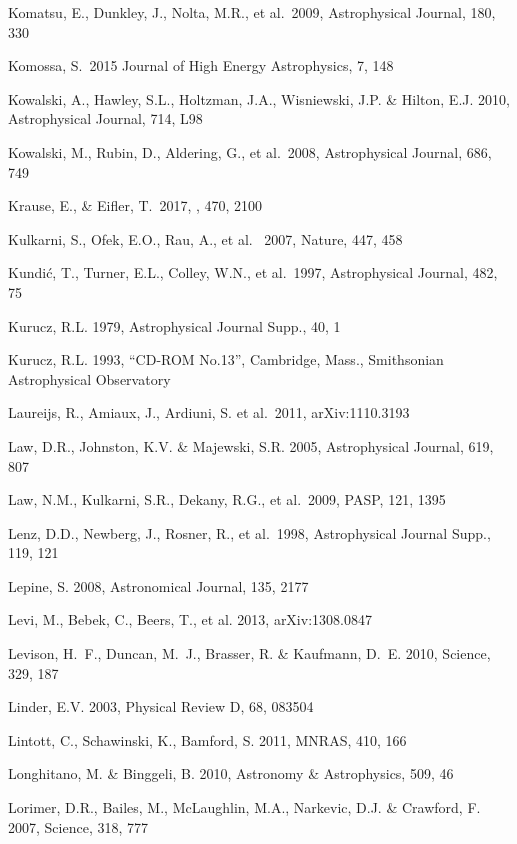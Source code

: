 \documentclass{emulateapj}
\begin{document}
\begin{thebibliography}{}
\bibitem[()]{} Komatsu, E., Dunkley, J., Nolta, M.R., et al.~2009, Astrophysical Journal, 180, 330

\bibitem[()]{} Komossa, S.~2015 Journal of High Energy Astrophysics, 7, 148


\bibitem[()]{} Kowalski, A., Hawley, S.L., Holtzman, J.A., Wisniewski, J.P. \& Hilton, E.J. 2010, Astrophysical Journal, 714, L98

\bibitem[()]{} Kowalski, M., Rubin, D., Aldering, G., et al.~2008,  Astrophysical Journal, 686, 749

\bibitem[()]{} Krause, E., \& Eifler, T.\ 2017, \mnras, 470, 2100

\bibitem[()]{} Kulkarni, S., Ofek, E.O., Rau, A., et al.~ 2007, Nature, 447, 458

\bibitem[()]{} Kundi\'{c}, T., Turner, E.L., Colley, W.N., et al.~1997, Astrophysical Journal, 482, 75

\bibitem[()]{} Kurucz, R.L. 1979, Astrophysical Journal Supp., 40, 1

\bibitem[()]{} Kurucz, R.L. 1993, ``CD-ROM No.13”, Cambridge, Mass., Smithsonian Astrophysical Observatory

\bibitem[()]{} Laureijs, R., Amiaux, J., Ardiuni, S. et al.~2011, arXiv:1110.3193

\bibitem[()]{} Law, D.R., Johnston, K.V. \& Majewski, S.R. 2005,  Astrophysical Journal, 619, 807

\bibitem[()]{} Law, N.M., Kulkarni, S.R., Dekany, R.G., et al.~2009, PASP, 121, 1395

\bibitem[()]{} Lenz, D.D., Newberg, J., Rosner, R., et al.~1998, Astrophysical Journal Supp., 119, 121

\bibitem[()]{} Lepine, S. 2008, Astronomical Journal, 135, 2177

\bibitem[()]{} Levi, M., Bebek, C., Beers, T., et al. 2013, arXiv:1308.0847

\bibitem[()]{} Levison, H.~F., Duncan, M.~J., Brasser, R. \& Kaufmann, D.~E. 2010, Science, 329, 187

\bibitem[()]{} Linder, E.V. 2003, Physical Review D, 68, 083504

\bibitem[()]{} Lintott, C., Schawinski, K., Bamford, S. 2011, MNRAS,
  410, 166

\bibitem[()]{} Longhitano, M. \& Binggeli, B. 2010, Astronomy \& Astrophysics, 509, 46

\bibitem[()]{} Lorimer, D.R., Bailes, M., McLaughlin, M.A., Narkevic, D.J. \& Crawford, F. 2007, Science, 318, 777


\end{thebibliography}
\end{document}
